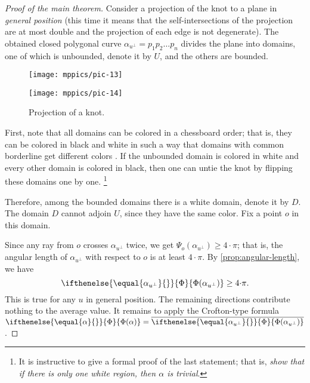 \documentclass{article}
\theoremstyle{theorem}
\newtheorem{Crofton-type formula}[theorem]{Crofton-type formula}
\newtheorem{Douglas--Rado theorem}[theorem]{Douglas--Rado theorem}
\newtheorem{Extended monotonicity theorem}[theorem]{Extended monotonicity theorem}
\theoremstyle{definition}
\newcommand*{\tc}[1]{\ifthenelse{\equal{#1}{}}{\Phi}{\Phi({#1})}}%
\begin{document}
\begin{proof}[Proof of the main theorem]
Consider a projection of the knot to a plane in \emph{general position}
(this time it means that the self-intersections of the projection are at most double and the projection of each edge is not degenerate).
The obtained closed polygonal curve $\alpha_{u^\perp}=p_1p_2\dots p_n$ divides the plane into domains, one of which is unbounded, denote it by $U$, and the others are bounded.

\begin{figure}[!ht]
\begin{minipage}{.48\textwidth}
\centering
\texttt{[image: mppics/pic-13]}
\end{minipage}\hfill
\begin{minipage}{.48\textwidth}
\centering
\texttt{[image: mppics/pic-14]}
\end{minipage}

\medskip

\begin{minipage}{.48\textwidth}
\centering
\caption{Projection of an unknot.}
\end{minipage}\hfill
\begin{minipage}{.48\textwidth}
\centering
\caption{Projection of a knot.}
\end{minipage}
\vskip-0mm
\end{figure}

First, note that all domains can be colored in a chessboard order;
that is, they can be colored in black and white in such a way that domains with common borderline get different colors \cite[Exercise 2.27]{adams}.
If the unbounded domain is colored in white and every other domain is colored in black, then one can untie the knot by flipping these domains one by one.%
\footnote{It is instructive to give a formal proof of the last statement; that is, \textit{show that if there is only one white region, then $\alpha$ is trivial}.}

Therefore, among the bounded domains there is a white domain, denote it by $D$.
The domain $D$ cannot adjoin %
$U$, since they have the same color.
Fix a point $o$ in this domain.

Since any ray from $o$ crosses $\alpha_{u^\perp}$ twice, we get $\Psi_o(\alpha_{u^\perp})\ge 4{\cdot}\pi$;
that is, the angular length of $\alpha_{u^\perp}$ with respect to $o$ is at least $4{\cdot}\pi$. 
By \ref{prop:angular-length}, we have 
\[\tc{\alpha_{u^\perp}}\ge4{\cdot}\pi.\]
This is true for any $u$ in general position.
The remaining directions contribute nothing to the average value.
It remains to apply the Crofton-type formula $\tc{\alpha}=\overline{\tc{\alpha_{u^\perp}}}$.
\end{proof}
\end{document}

